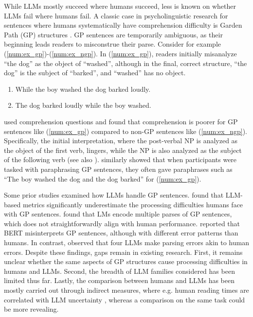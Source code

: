 While LLMs mostly succeed where humans succeed, less is known on whether LLMs fail where humans fail. A classic case in psycholinguistic research for sentences where humans systematically have comprehension difficulty is Garden Path (GP) structures \cite{gp3, gp2, gp1}. GP sentences are temporarily ambiguous, as their beginning leads readers to misconstrue their parse. Consider for example (\ref{num:ex_gp})-(\ref{num:ex_ngp}). In (\ref{num:ex_gp}), readers initially misanalyze ``the dog'' as the object of ``washed'', although in the final, correct structure, ``the dog'' is the subject of ``barked'', and ``washed'' has no object. 
\begin{enumerate}[nosep]
    \item \label{num:ex_gp} While the boy washed the dog barked loudly. 
    \item \label{num:ex_ngp} The dog barked loudly while the boy washed.
\end{enumerate}
\citet{christianson2001} used comprehension questions and found that comprehension is poorer for GP sentences like (\ref{num:ex_gp}) compared to non-GP sentences like (\ref{num:ex_ngp}). Specifically, the initial interpretation, where the post-verbal NP is analyzed as the object of the first verb, lingers, while the NP is also analyzed as the subject of the following verb (see also \citet{christianson2006}). \citet{patson2009lingering} similarly showed that when participants were tasked with paraphrasing GP sentences,  they often gave paraphrases such as ``The boy washed the dog and the dog barked'' for (\ref{num:ex_gp}). 

Some prior studies examined how LLMs handle GP sentences. \citet{gp_reading_time} found that LLM-based metrics significantly underestimate the processing difficulties humans face with GP sentences. \citet{hanna2024incrementalsentenceprocessingmechanisms} found that LMs encode multiple parses of GP sentences, which does not straightforwardly align with human performance. \citet{bert_gp} reported that BERT misinterprets GP sentences, although with different error patterns than humans. In contrast, \citet{Li2024IncrementalCO} observed that four LLMs make parsing errors akin to human errors. Despite these findings, gaps remain in existing research. First, it remains unclear whether the same aspects of GP structures cause processing difficulties in humans and LLMs. Second, the breadth of LLM families considered has been limited thus far.
Lastly, the comparison between humans and LLMs has been mostly carried out through indirect measures, where e.g. human reading times are correlated with LLM uncertainty \cite{wilcox-gpt2-abilities, Rego2024LanguageMO, Sun2024ComputationalSM}, whereas a comparison on the same task could be more revealing. 




